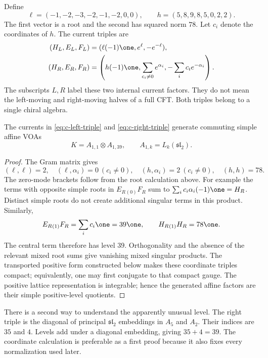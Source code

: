 Define
\[
 \ell=(-1,-2,-3,-2,-1,-2,0,0),\qquad
 h=(5,8,9,8,5,0,2,2).
\]
The first vector is a root and the second has squared norm $78$. Let
$c_i$ denote the coordinates of $h$. The current triples are
\begin{align}
 (H_L,E_L,F_L)&=(\ell(-1)\one,e^\ell,-e^{-\ell}),
 \label{eq:c-left-triple}\\
 (H_R,E_R,F_R)&=
 \left(h(-1)\one,\sum_{c_i\ne0}e^{\alpha_i},
                    -\sum_i c_i e^{-\alpha_i}\right).
 \label{eq:c-right-triple}
\end{align}
The subscripts $L,R$ label these two internal current factors. They do
not mean the left-moving and right-moving halves of a full CFT. Both
triples belong to a single chiral algebra.

\begin{proposition}
The currents in \eqref{eq:c-left-triple} and
\eqref{eq:c-right-triple} generate commuting simple affine VOAs
\[
 K=A_{1,1}\otimes A_{1,39},\qquad
 A_{1,k}=L_k(\mathfrak{sl}_2).
\]
\end{proposition}
\begin{proof}
The Gram matrix gives
\[
 (\ell,\ell)=2,\quad(\ell,\alpha_i)=0\ (c_i\ne0),
 \quad(h,\alpha_i)=2\ (c_i\ne0),\quad(h,h)=78.
\]
The zero-mode brackets follow from the root calculation above. For
example the terms with opposite simple roots in $E_R{}_{(0)}F_R$
sum to $\sum_i c_i\alpha_i(-1)\one=H_R$. Distinct simple roots
do not create additional singular terms in this product. Similarly,
\[
 E_R{}_{(1)}F_R=\sum_i c_i\one=39\one,
 \qquad H_R{}_{(1)}H_R=78\one.
\]
The central term therefore has level $39$. Orthogonality and the
absence of the relevant mixed root sums give vanishing mixed singular
products. The transported positive form constructed below makes these
coordinate triples compact; equivalently, one may first conjugate to
that compact gauge. The positive lattice representation is integrable; hence
the generated affine factors are their simple positive-level quotients.
\end{proof}

There is a second way to understand the apparently unusual level.
The right triple is the diagonal of principal $\mathfrak{sl}_2$
embeddings in $A_5$ and $A_2$. Their indices are $35$ and $4$.
Levels add under a diagonal embedding, giving $35+4=39$.
The coordinate calculation is preferable as a first proof because it
also fixes every normalization used later.

